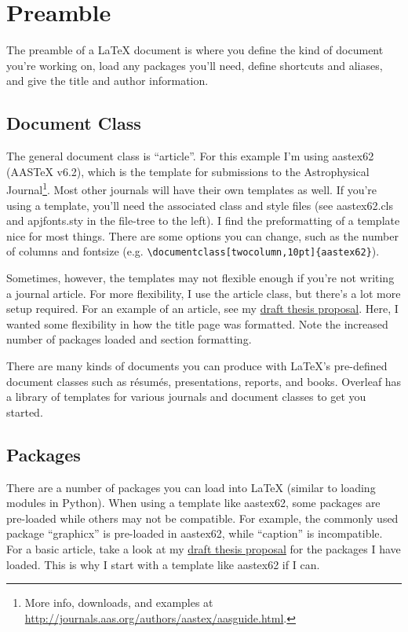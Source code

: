 \documentclass[onecolumn,12pt]{aastex62}
\begin{document}
\section{Preamble}
\label{sec:preamble}
The preamble of a LaTeX document is where you define the kind of document you're working on, load any packages you'll need, define shortcuts and aliases, and give the title and author information.

\subsection{Document Class}
\label{ssec:docclass}
The general document class is ``article''. For this example I'm using aastex62 (AASTeX v6.2), which is the template for submissions to the Astrophysical Journal\footnote{More info, downloads, and examples at \url{http://journals.aas.org/authors/aastex/aasguide.html}.}. Most other journals will have their own templates as well. If you're using a template, you'll need the associated class and style files (see aastex62.cls and apjfonts.sty in the file-tree to the left). I find the preformatting of a template nice for most things. There are some options you can change, such as the number of columns and fontsize (e.g. \verb|\documentclass[twocolumn,10pt]{aastex62}|).

Sometimes, however, the templates may not flexible enough if you're not writing a journal article. For more flexibility, I use the article class, but there's a lot more setup required. For an example of an article, see my \href{https://www.overleaf.com/read/kvjqzkbkjdnh}{draft thesis proposal}. Here, I wanted some flexibility in how the title page was formatted. Note the increased number of packages loaded and section formatting.

There are many kinds of documents you can produce with LaTeX's pre-defined document classes such as r\'esum\'es, presentations, reports, and books. Overleaf has a library of templates for various journals and document classes to get you started.

\subsection{Packages}
\label{ssec:packages}
There are a number of packages you can load into LaTeX (similar to loading modules in Python). When using a template like aastex62, some packages are pre-loaded while others may not be compatible. For example, the commonly used package ``graphicx'' is pre-loaded in aastex62, while ``caption'' is incompatible. For a basic article, take a look at my \href{https://www.overleaf.com/read/kvjqzkbkjdnh}{draft thesis proposal} for the packages I have loaded. This is why I start with a template like aastex62 if I can.
\end{document}
